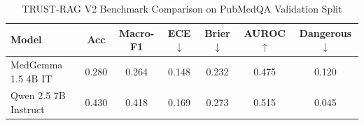 \begin{table}[ht]
\centering
\small
\caption{TRUST-RAG V2 Benchmark Comparison on PubMedQA Validation Split}
\label{tab:trust_rag_comparison}
\begin{tabular}{lcccccc}
\toprule
\textbf{Model} & \textbf{Acc} & \textbf{Macro-F1} & \textbf{ECE $\downarrow$} & \textbf{Brier $\downarrow$} & \textbf{AUROC $\uparrow$} & \textbf{Dangerous $\downarrow$} \\
\midrule
MedGemma 1.5 4B IT & 0.280 & 0.264 & 0.148 & 0.232 & 0.475 & 0.120 \\
Qwen 2.5 7B Instruct & 0.430 & 0.418 & 0.169 & 0.273 & 0.515 & 0.045 \\
\bottomrule
\end{tabular}
\end{table}
